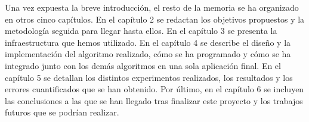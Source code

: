 \hspace{1cm} Una vez expuesta la breve introducción, el resto de la memoria se ha organizado en otros cinco capítulos. En el capítulo 2 se redactan los objetivos propuestos y la metodología seguida para llegar hasta ellos. En el capítulo 3 se presenta la infraestructura que hemos utilizado. En el capítulo 4 se describe el diseño y la implementación del algoritmo realizado, cómo se ha programado y cómo se ha integrado junto con los demás algoritmos en una sola aplicación final. En el capítulo 5 se detallan los distintos experimentos realizados, los resultados y los errores cuantificados que se han obtenido. Por último, en el capítulo 6 se incluyen las conclusiones a las que se han llegado tras finalizar este proyecto y los trabajos futuros que se podrían realizar.

